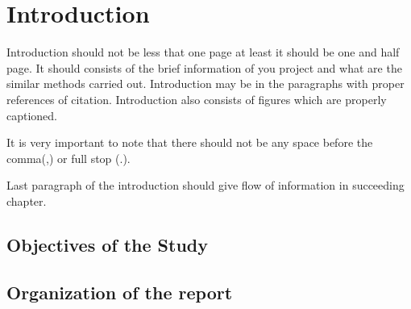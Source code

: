 
\chapter{Introduction}

Introduction should not be less that one page at least it should be one and half page. It should consists of the brief information of you project and what are the similar methods carried out. Introduction may be in the paragraphs with proper references of citation. Introduction also consists of figures which are properly captioned. 
\par It is very important to note that there should not be any space before the comma(,) or full stop (.). 
\par Last paragraph of the introduction should give flow of information in succeeding chapter.  

\section{Objectives of the Study}

\section{Organization of the report}
